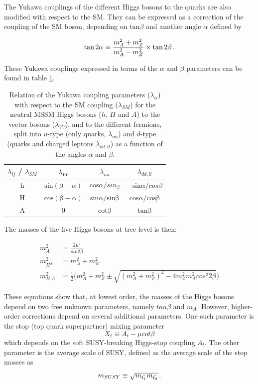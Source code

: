 The Yukawa couplings of the different Higgs bosons to the quarks are also modified with respect to the SM. They can be expressed as a correction of the coupling of the SM boson, depending on $\mathrm{tan} \beta$ and another angle $\alpha$ defined by 

\begin{equation}
    \mathrm{tan}\,2\alpha \equiv \frac{m_{A}^2 + m_{Z}^2}{m_{A}^2 - m_{Z}^2} \times \mathrm{tan}\,2\beta \mend
\end{equation}

These Yukawa couplings expressed in terms of the $\alpha$ and $\beta$ parameters can be found in table \ref{tab:yukawaMSSM}.
\begin{table}[]
    \centering
    \caption{Relation of the Yukawa coupling parameters ($\lambda_{ii}$) with respect to the SM coupling ($\lambda_{SM}$) for the neutral MSSM Higgs bosons ($h$, $H$ and $A$) to the vector bosons ($\lambda_{VV}$), and to the different fermions, split into $u$-type (only quarks, $\lambda_{uu}$) and $d$-type (quarks and charged leptons $\lambda_{dd,ll}$) as a function of the angles $\alpha$ and $\beta$.}
    \begin{tabular}{c c c c}
        $\lambda_{ij}$ / $\lambda_{SM}$ & $\lambda_{VV}$ & $\lambda_{uu}$ & $\lambda_{dd,ll}$ \\
        \hline
        h & $\mathrm{sin}(\beta - \alpha)$ & $\mathrm{cos}\alpha/sin_\beta$ & $-\mathrm{sin}\alpha / cos\beta$ \\
        H & $\mathrm{cos(\beta - \alpha)}$ & $\mathrm{sin\alpha / sin\beta}$ & $\mathrm{cos\alpha / cos \beta}$ \\
        A & 0 & $\mathrm{cot\beta}$ & $\mathrm{tan\beta}$ \\
        \hline
    \end{tabular}
    \label{tab:yukawaMSSM}
\end{table}

The masses of the five Higgs bosons at tree level is then:

\begin{align}
    m_{A}^2 &= \frac{2\mu^2}{sin 2\beta} \\
    m_{H^{\pm}}^2 &= m_{A}^2 + m_{W}^2 \\
    m_{H,h}^2 &= \frac{1}{2} \big( m_A^2 + m_Z^2 \pm \sqrt{(m_A^2 + m_Z^2)^2 - 4m_Z^2 m_A^2 cos^2 2\beta} \big)
\end{align}

These equations show that, at lowest order, the masses of the Higgs bosons depend on two free unknown parameters, namely $tan \beta$ and $m_A$. However, higher-order corrections depend on several additional parameters. One such parameter is the stop (top quark superpartner) mixing parameter
\begin{equation}
    X_t \equiv A_t - \mu cot\beta
\end{equation}
which depends on the soft SUSY-breaking Higgs-stop coupling $A_t$. The other parameter is the average scale of SUSY, defined as the average scale of the stop masses as
\begin{equation}
    m_{SUSY} \equiv \sqrt{m_{\Tilde{t_1}}m_{\Tilde{t_2}}} \mend
\end{equation}

